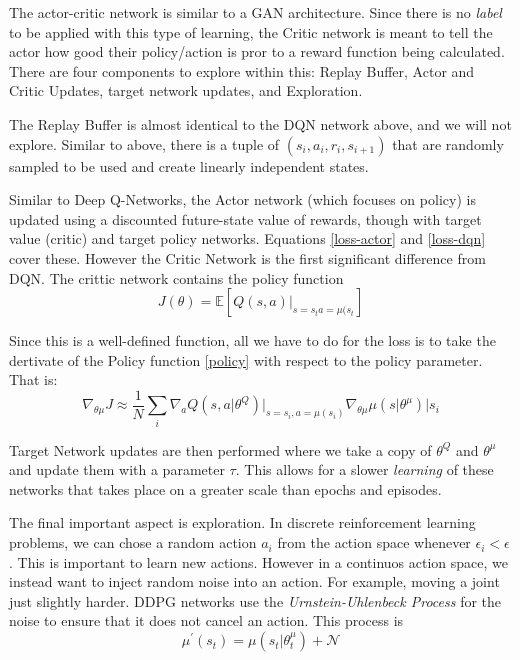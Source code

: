 \documentclass[man, 12pt]{apa6}
\begin{document}
The actor-critic network is similar to a GAN architecture. Since there is no \emph{label} to be applied with this type of learning, the Critic network is meant to tell the actor how good their policy/action is pror to a reward function being calculated. There are four components to explore within this: Replay Buffer, Actor and Critic Updates, target network updates, and Exploration. 

The Replay Buffer is almost identical to the DQN network above, and we will not explore. Similar to above, there is a tuple of $(s_{i}, a_{i}, r_{i}, s_{i+1})$ that are randomly sampled to be used and create linearly independent states.

Similar to Deep Q-Networks, the Actor network (which focuses on policy) is updated using a discounted future-state value of rewards, though with target value (critic) and target policy networks. Equations \ref{loss-actor} and \ref{loss-dqn} cover these.  However the Critic Network is the first significant difference from DQN. The crittic network contains the policy function \begin{equation} \label{policy} 
J(\theta) = \mathbb{E}  \left[ Q(s,a) \vert_{s=s_{t}a=\mu(s_{t}} \right]
\end{equation} 

Since this is a well-defined function, all we have to do for the loss is to take the dertivate of the Policy function  \ref{policy} with respect to the policy parameter. That is:  \begin{equation} \label{polderiv}  \nabla_{\theta \mu} J \approx \frac{1}{N} \sum_{i} \nabla_{a} Q(s, a \vert \theta^{Q}) \vert_{s=s_{i}, a = \mu (s_{i})}  \nabla_{\theta\mu} \mu(s \vert \theta ^{\mu}) \vert s_{i} \end{equation}

Target Network updates are then performed where we take a copy of $\theta^{Q}$ and $\theta^{\mu}$ and update them with a parameter $\tau$. This allows for a slower \emph{learning} of these networks that takes place on a greater scale than epochs and episodes. 

The final important aspect is exploration. In discrete reinforcement learning problems, we can chose a random action $a_{i}$ from the action space whenever $\epsilon_{i} < \epsilon$. This is important to learn new actions. However in a continuos action space, we instead want to inject random noise into an action. For example, moving a joint just slightly harder. DDPG networks use the \emph{Urnstein-Uhlenbeck Process} for the noise to ensure that it does not cancel an action. This process is \[ \mu ^{\prime}(s_{t}) = \mu( s_{t} \vert \theta^{\mu}_{t}) + \mathcal{N}\]
\end{document}

